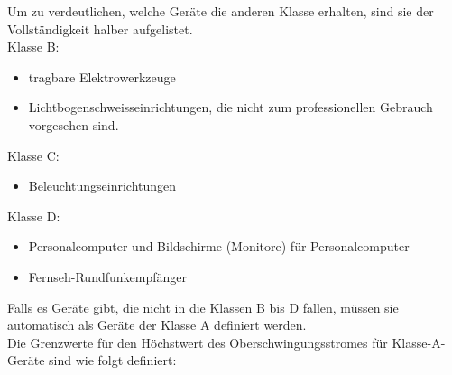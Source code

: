 Um zu verdeutlichen, welche Geräte die anderen Klasse erhalten, sind sie der Vollständigkeit halber aufgelistet.\\
Klasse B:
\begin{itemize}
	\item tragbare Elektrowerkzeuge 	
	\item Lichtbogenschweisseinrichtungen, die nicht zum professionellen Gebrauch vorgesehen sind.
\end{itemize} 
Klasse C:
\begin{itemize}
	\item Beleuchtungseinrichtungen	
\end{itemize} 
Klasse D:
\begin{itemize}
	\item Personalcomputer und Bildschirme (Monitore) für Personalcomputer	
	\item Fernseh-Rundfunkempfänger
\end{itemize}


Falls es Geräte gibt, die nicht in die Klassen B bis D fallen, müssen sie automatisch als Geräte der Klasse A definiert werden.\\
Die Grenzwerte für den Höchstwert des Oberschwingungsstromes für Klasse-A-Geräte sind wie folgt definiert:

